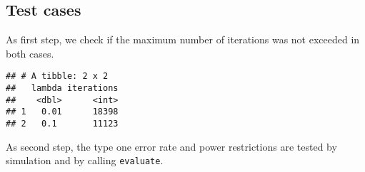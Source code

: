 \documentclass[
]{book}
\newenvironment{Shaded}{\begin{snugshade}}{\end{snugshade}}
\newcommand{\DataTypeTok}[1]{\textcolor[rgb]{0.13,0.29,0.53}{#1}}
\newcommand{\KeywordTok}[1]{\textcolor[rgb]{0.13,0.29,0.53}{\textbf{#1}}}
\newcommand{\NormalTok}[1]{#1}
\newcommand{\OperatorTok}[1]{\textcolor[rgb]{0.81,0.36,0.00}{\textbf{#1}}}
\newcommand{\StringTok}[1]{\textcolor[rgb]{0.31,0.60,0.02}{#1}}
\begin{document}
\hypertarget{test-cases-13}{%
\subsection{Test cases}\label{test-cases-13}}

As first step, we check if the maximum number of iterations was not exceeded
in both cases.

\begin{Shaded}
\end{Shaded}

\begin{verbatim}
## # A tibble: 2 x 2
##   lambda iterations
##    <dbl>      <int>
## 1   0.01      18398
## 2   0.1       11123
\end{verbatim}

As second step, the type one error rate and power restrictions are tested
by simulation and by calling \texttt{evaluate}.
\end{document}
